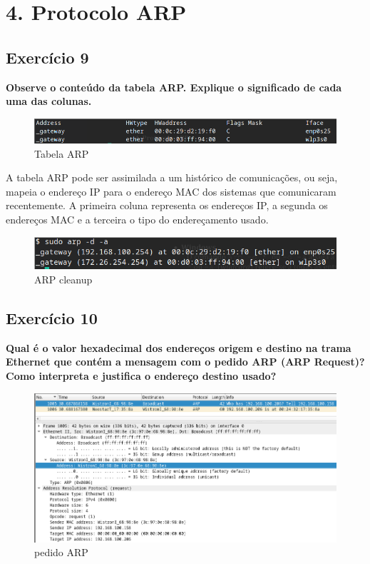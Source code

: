 \documentclass[a4paper]{report}
\begin{document}
\chapter{4. Protocolo ARP}
\section{Exercício 9}
\textbf{Observe o conteúdo da tabela ARP. Explique o significado de cada uma
das colunas.}

\begin{figure}[H]
    \centering 
    \includegraphics[width=\textwidth]{images/tabelaArp.png}
    \caption{Tabela ARP}
    \label{fig:tabelaArp}
\end{figure}
A tabela ARP pode ser assimilada a um histórico de comunicações, ou seja, mapeia
o endereço IP para o endereço MAC dos sistemas que comunicaram recentemente.
A primeira coluna representa os endereços IP, a segunda os endereços MAC e 
a terceira o tipo do endereçamento usado.

\begin{figure}[H]
    \centering 
    \includegraphics[width=\textwidth]{images/arpCleanup.png}
    \caption{ARP cleanup}
    \label{fig:arpCleanup}
\end{figure}

\section{Exercício 10}
\textbf{Qual é o valor hexadecimal dos endereços origem e destino na trama
Ethernet que contém a mensagem com o pedido ARP (ARP Request)? Como interpreta e
justifica o endereço destino usado?}

\begin{figure}[H]
    \centering 
    \includegraphics[width=\textwidth]{images/ex10.png}
    \caption{pedido ARP}
    \label{fig:ex10}
\end{figure}
\end{document}
